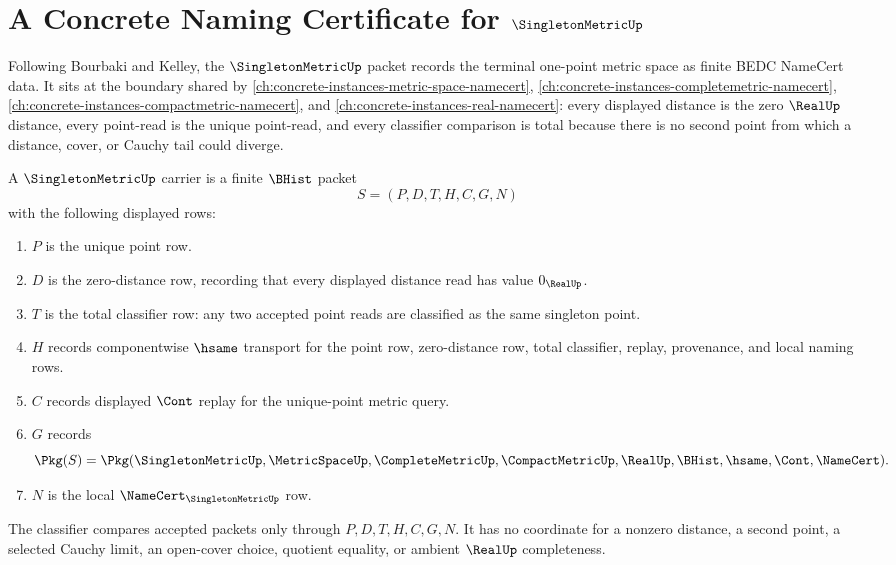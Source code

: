 \chapter{A Concrete Naming Certificate for $\SingletonMetricUp$}
\label{ch:concrete-instances-singletonmetric-namecert}

Following Bourbaki and Kelley, the $\SingletonMetricUp$ packet records the terminal one-point metric space as finite BEDC NameCert data. It sits at the boundary shared by \autoref{ch:concrete-instances-metric-space-namecert}, \autoref{ch:concrete-instances-completemetric-namecert}, \autoref{ch:concrete-instances-compactmetric-namecert}, and \autoref{ch:concrete-instances-real-namecert}: every displayed distance is the zero $\RealUp$ distance, every point-read is the unique point-read, and every classifier comparison is total because there is no second point from which a distance, cover, or Cauchy tail could diverge.

\begin{definition}
\label{def:singletonmetric-carrier}
A $\SingletonMetricUp$ carrier is a finite $\BHist$ packet
$$
S=(P,D,T,H,C,G,N)
$$
with the following displayed rows:
\begin{enumerate}
\item $P$ is the unique point row.
\item $D$ is the zero-distance row, recording that every displayed distance read has value $0_{\RealUp}$.
\item $T$ is the total classifier row: any two accepted point reads are classified as the same singleton point.
\item $H$ records componentwise $\hsame$ transport for the point row, zero-distance row, total classifier, replay, provenance, and local naming rows.
\item $C$ records displayed $\Cont$ replay for the unique-point metric query.
\item $G$ records
$$
\Pkg(S)=\Pkg(\SingletonMetricUp,\MetricSpaceUp,\CompleteMetricUp,\CompactMetricUp,\RealUp,\BHist,\hsame,\Cont,\NameCert).
$$
\item $N$ is the local $\NameCert_{\SingletonMetricUp}$ row.
\end{enumerate}
The classifier compares accepted packets only through $P,D,T,H,C,G,N$. It has no coordinate for a nonzero distance, a second point, a selected Cauchy limit, an open-cover choice, quotient equality, or ambient $\RealUp$ completeness.
\end{definition}


